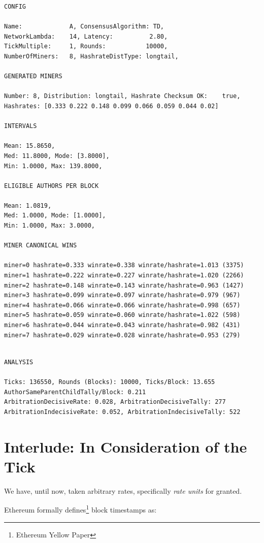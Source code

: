\documentclass[11pt]{article}
\begin{document}
	\begin{verbatim}
CONFIG

Name:             A, ConsensusAlgorithm: TD,
NetworkLambda:    14, Latency:          2.80,
TickMultiple:     1, Rounds:           10000,
NumberOfMiners:   8, HashrateDistType: longtail,

GENERATED MINERS

Number: 8, Distribution: longtail, Hashrate Checksum OK:    true,
Hashrates: [0.333 0.222 0.148 0.099 0.066 0.059 0.044 0.02]

INTERVALS

Mean: 15.8650,
Med: 11.8000, Mode: [3.8000],
Min: 1.0000, Max: 139.8000,

ELIGIBLE AUTHORS PER BLOCK

Mean: 1.0819,
Med: 1.0000, Mode: [1.0000],
Min: 1.0000, Max: 3.0000,

MINER CANONICAL WINS

miner=0 hashrate=0.333 winrate=0.338 winrate/hashrate=1.013 (3375)
miner=1 hashrate=0.222 winrate=0.227 winrate/hashrate=1.020 (2266)
miner=2 hashrate=0.148 winrate=0.143 winrate/hashrate=0.963 (1427)
miner=3 hashrate=0.099 winrate=0.097 winrate/hashrate=0.979 (967)
miner=4 hashrate=0.066 winrate=0.066 winrate/hashrate=0.998 (657)
miner=5 hashrate=0.059 winrate=0.060 winrate/hashrate=1.022 (598)
miner=6 hashrate=0.044 winrate=0.043 winrate/hashrate=0.982 (431)
miner=7 hashrate=0.029 winrate=0.028 winrate/hashrate=0.953 (279)

	\end{verbatim}
	\pagebreak
	\begin{verbatim}

ANALYSIS

Ticks: 136550, Rounds (Blocks): 10000, Ticks/Block: 13.655
AuthorSameParentChildTally/Block: 0.211
ArbitrationDecisiveRate: 0.028, ArbitrationDecisiveTally: 277
ArbitrationIndecisiveRate: 0.052, ArbitrationIndecisiveTally: 522

	\end{verbatim}


	\section{\normalsize{Interlude: In Consideration of the Tick}}

	We have, until now, taken arbitrary rates, specifically \emph{rate units} for
	granted.

	Ethereum formally defines\footnote{Ethereum Yellow Paper} block timestamps as:
\end{document}
